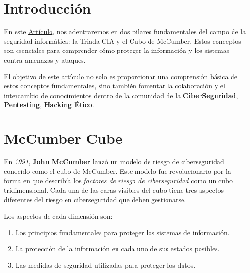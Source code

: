 \documentclass[a4paper]{article} %
\begin{document}
\cfoot{\thepage} %
\begin{titlepage}
\end{titlepage}


\clearpage
\tableofcontents
\clearpage
 

\section{Introducción}

En este \underline{Artículo}, nos adentraremos en dos pilares fundamentales del campo de la seguridad informática: la Triada CIA y el Cubo de McCumber. Estos conceptos son esenciales para comprender cómo proteger la información y los sistemas contra amenazas y ataques.\par 

El objetivo de este artículo no solo es proporcionar una comprensión básica de estos conceptos fundamentales, sino también fomentar la colaboración y el intercambio de conocimientos dentro de la comunidad de la \textbf{CiberSeguridad}, \textbf{Pentesting}, \textbf{Hacking Ético}.\par

\section{McCumber Cube}

En \textit{1991}, \textbf{John McCumber} lanzó un modelo de riesgo de ciberseguridad conocido como el cubo de McCumber.
Este modelo fue revolucionario por la forma en que describía los \textit{factores de riesgo de ciberseguridad} como un cubo
tridimensional. Cada una de las caras visibles del cubo tiene tres aspectos diferentes del riesgo en ciberseguridad que deben
gestionarse.

Los aspectos de cada dimensión son:

\begin{enumerate}
    \item Los principios fundamentales para proteger los sistemas de información.
    \item La protección de la información en cada uno de sus estados posibles.
    \item Las medidas de seguridad utilizadas para proteger los datos.
\end{enumerate}
\end{document}
